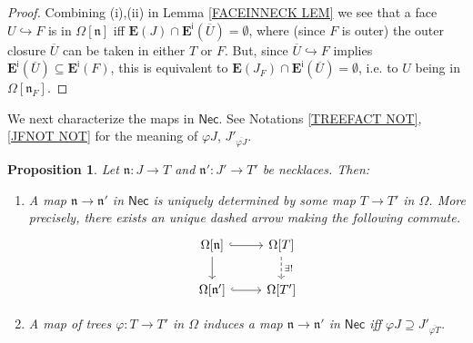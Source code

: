 \documentclass[a4paper,10pt
,draft
]{article}%
\numberwithin{equation}{section}
\numberwithin{figure}{section}
\newtheorem{proposition}[equation]{Proposition}%
\theoremstyle{definition} %
\newcommand{\1}{\ensuremath{\mathbbm 1}}%
\begin{document}
\begin{proof}
	Combining (i),(ii) in 
	Lemma \ref{FACEINNECK LEM}
	we see that a face $U \hookrightarrow F$ is
	in $\Omega[\mathfrak{n}]$
	iff $\boldsymbol{E}(J) \cap 
	\boldsymbol{E}^{\mathsf{i}}(\overline{U}) = \emptyset$,
	where (since $F$ is outer) the outer closure $\overline{U}$
	can be taken in either $T$ or $F$.
	But,
	since $\overline{U} \hookrightarrow F$
	implies 
	$\boldsymbol{E}^{\mathsf{i}}(\overline{U})
	\subseteq 
	\boldsymbol{E}^{\mathsf{i}}(F)$,
	this is equivalent to 
	$\boldsymbol{E}(J_F) \cap 
	\boldsymbol{E}^{\mathsf{i}}(\overline{U}) = \emptyset$,
	i.e. to $U$ being in $\Omega[\mathfrak{n}_F]$.
\end{proof}


We next characterize the maps in $\mathsf{Nec}$.
See Notations \ref{TREEFACT NOT}, \ref{JFNOT NOT}
for the meaning of
$\varphi J$,
$J'_{\overline{\varphi J}}$.



\begin{proposition}\label{MAPNECK PROP}
	Let $\mathfrak{n}\colon J \to T$ and $\mathfrak{n}' \colon J' \to T'$ be necklaces. Then:
\begin{enumerate}
\item[(i)]
	A map $\mathfrak{n} \to \mathfrak{n}'$ in $\mathsf{Nec}$
	is uniquely determined by some map 
	$T \to T'$ in $\Omega$. 
	More precisely, there exists an unique dashed arrow
	making the following commute.
\begin{equation}\label{NECKMAP EQ}
\begin{tikzcd}
	\Omega[\mathfrak{n}] 
	\ar[hookrightarrow]{r} 
	\ar{d}
&
	\Omega[T] 
	\ar[dashed]{d}{\exists !}
\\
	\Omega[\mathfrak{n}']
	\ar[hookrightarrow]{r}
&
	\Omega[T']
	\end{tikzcd}
\end{equation}
\item[(ii)]
	A map of trees 
	$\varphi \colon T \to T'$ in $\Omega$
	induces a map 
	$\mathfrak{n} \to \mathfrak{n}'$ in $\mathsf{Nec}$
	iff
	$\varphi J \supseteq J'_{\overline{\varphi T}}$.
\end{enumerate}
\end{proposition}
\end{document}
